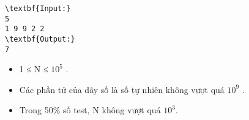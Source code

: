 \begin{verbatim}
\textbf{Input:}
5
1 9 9 2 2
\textbf{Output:}
7\end{verbatim}
\begin{itemize}
	\item 1 ≤ N ≤ $10^{5}$ .
	\item Các phần tử của dãy số là số tự nhiên không vượt quá $10^{9}$ .
	\item Trong 50\% số test, N không vượt quá $10^{3}$.
\end{itemize}